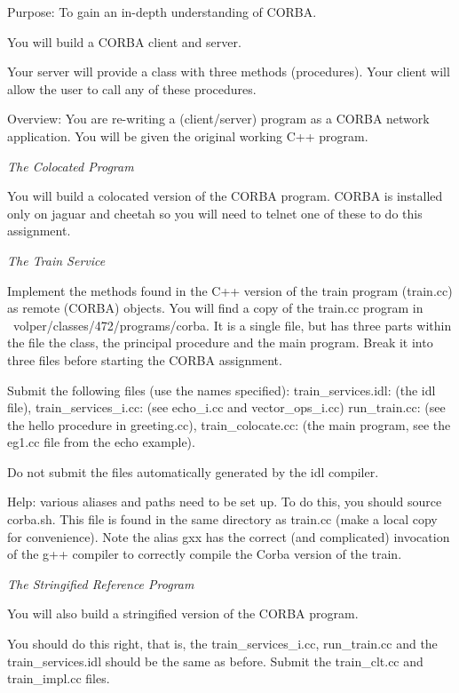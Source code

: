 

\parindent 0pt

Purpose: To gain an in-depth understanding of
CORBA.

You will build a CORBA client and server.

Your server will provide a class with three methods (procedures).
Your client will allow the user to call any of these procedures.

Overview: You are re-writing a (client/server) program as
a CORBA network application.
You will be given the original working C++ program.

{\it The Colocated Program} 

You will build a colocated version of the CORBA program.
CORBA is installed only on jaguar and cheetah so you will need to telnet one
of these to do this assignment.

{\it The Train Service}

Implement the methods found in the C++ version of the train program
({\ltt{}train.cc}) as remote (CORBA) objects.
You will find a copy of the {\ltt{}train.cc} program in
{\ltt{}~volper/classes/472/programs/corba}.
It is a single file, but has three parts within the file
the class, the principal procedure and the main program.
Break it into three files before starting the CORBA assignment.

Submit the following files (use the names specified):
\hfill\break
{\ltt{}train_services.idl}: (the idl file), 
\hfill\break
{\ltt{}train_services_i.cc}: (see {\ltt{}echo_i.cc} and {\ltt{}vector_ops_i.cc})
\hfill\break
{\ltt{}run_train.cc}: (see the {\ltt{}hello} procedure in {\ltt{}greeting.cc}),
\hfill\break
{\ltt{}train_colocate.cc}: (the main program, see the {\ltt{}eg1.cc} 
file from the echo example).

Do not submit the files automatically generated by the idl compiler.

Help: various aliases and paths need to be set up. To do this,
you should {\ltt{}source corba.sh}. This file is found in the
same directory as {\ltt{}train.cc} (make a local copy for convenience).
Note the alias {\ltt{}gxx} has the correct (and complicated) invocation
of the g++ compiler to correctly compile the Corba version of the train.

{\it The Stringified Reference Program} 

You will also build a stringified version of the CORBA program.

You should do this right, that is, the {\ltt{}train_services_i.cc},
{\ltt{}run_train.cc} and the {\ltt{}train_services.idl} should be the 
same as before.
Submit the {\ltt{}train_clt.cc} and {\ltt{}train_impl.cc} files.

\bye
